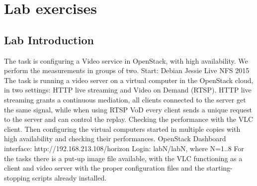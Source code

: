 \documentclass[a4paper]{article}
\begin{document}
\section{Lab exercises}

\subsection{Lab Introduction}

The task is configuring a Video service in OpenStack, with high availability. We perform the measurements in groups of two. Start: Debian Jessie Live NFS 2015
The task is running a video server on a virtual computer in the OpenStack cloud, in two settings: HTTP live streaming and Video on Demand (RTSP). HTTP live streaming grants a continuous mediation, all clients connected to the server get the same signal, while when using RTSP VoD every client sends a unique request to the server and can control the replay.
Checking the performance with the VLC client. Then configuring the virtual computers started in multiple copies with high availability and checking their performances.
OpenStack Dashboard interface: http://192.168.213.108/horizon
Login: labN/labN, where N=1..8
For the tasks there is a put-up image file available, with the VLC functioning as a client and video server with the proper configuration files and the starting-stopping scripts already installed.
\end{document}
